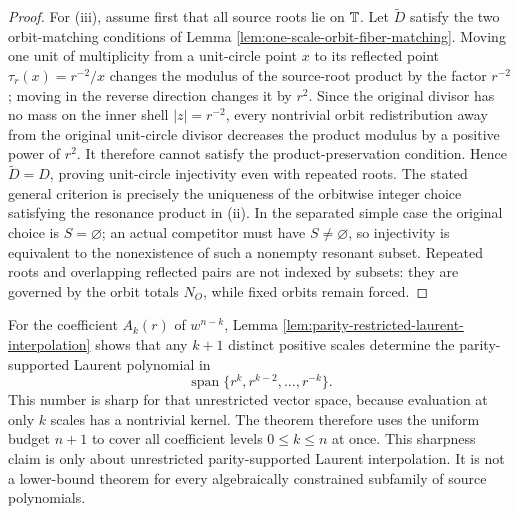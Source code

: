 \begin{proof}
For (iii), assume first that all source roots lie on \(\mathbb{T}\).  Let \(\widetilde D\) satisfy the two orbit-matching conditions of Lemma \ref{lem:one-scale-orbit-fiber-matching}.  Moving one unit of multiplicity from a unit-circle point \(x\) to its reflected point \(\tau_r(x)=r^{-2}/x\) changes the modulus of the source-root product by the factor \(r^{-2}\); moving in the reverse direction changes it by \(r^2\).  Since the original divisor has no mass on the inner shell \(|z|=r^{-2}\), every nontrivial orbit redistribution away from the original unit-circle divisor decreases the product modulus by a positive power of \(r^2\).  It therefore cannot satisfy the product-preservation condition.  Hence \(\widetilde D=D\), proving unit-circle injectivity even with repeated roots.  The stated general criterion is precisely the uniqueness of the orbitwise integer choice satisfying the resonance product in (ii).  In the separated simple case the original choice is \(S=\varnothing\); an actual competitor must have \(S\ne\varnothing\), so injectivity is equivalent to the nonexistence of such a nonempty resonant subset.  Repeated roots and overlapping reflected pairs are not indexed by subsets: they are governed by the orbit totals \(N_O\), while fixed orbits remain forced.
\end{proof}

\begin{remark}\label{rem:multiscale-sharpness-scope}
For the coefficient \(A_k(r)\) of \(w^{n-k}\), Lemma \ref{lem:parity-restricted-laurent-interpolation} shows that any \(k+1\) distinct positive scales determine the parity-supported Laurent polynomial in
\[
\operatorname{span}\{r^k,r^{k-2},\dots,r^{-k}\}.
\]
This number is sharp for that unrestricted vector space, because evaluation at only \(k\) scales has a nontrivial kernel.  The theorem therefore uses the uniform budget \(n+1\) to cover all coefficient levels \(0\le k\le n\) at once.  This sharpness claim is only about unrestricted parity-supported Laurent interpolation.  It is not a lower-bound theorem for every algebraically constrained subfamily of source polynomials.
\end{remark}

